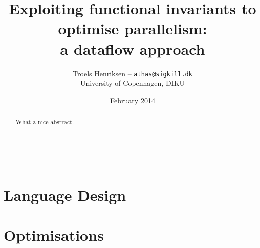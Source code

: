 \documentclass[10pt,a4paper,final,oneside,openany]{memoir}
\title{Exploiting functional invariants to optimise parallelism:\\a dataflow approach}
\author{
  Troels Henriksen -- \texttt{athas@sigkill.dk} \\
University of Copenhagen, DIKU}
\date{February 2014}
\begin{document}
\frontmatter

% 

 \clearpage

\maketitle
~
\vspace{3cm}
  \begin{abstract}
    What a nice abstract.
  \end{abstract}

\clearpage
\tableofcontents*

\mainmatter
{}


\part{Language Design}
\label{part:languagedesign}







\part{Optimisations}







\clearpage

{}
\printbibliography

\backmatter
\appendix

\end{document}

